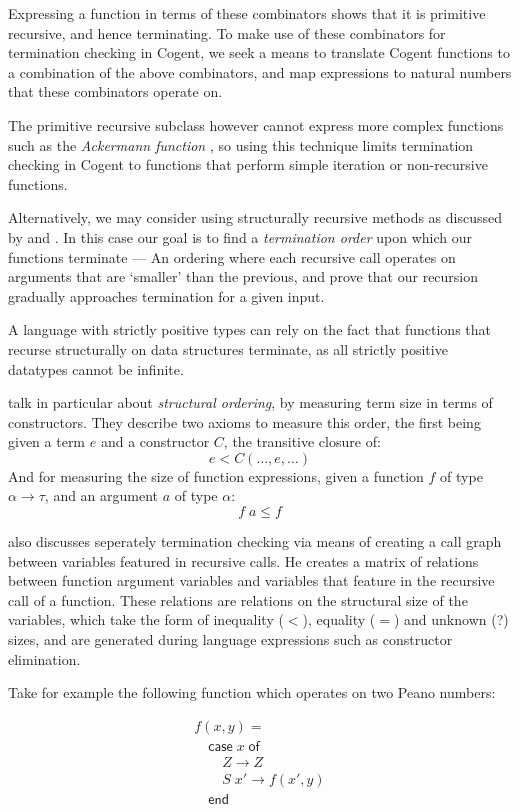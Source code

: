 Expressing a function in terms of these combinators shows that it is primitive recursive,
and hence terminating. To make use of these combinators for termination checking 
in Cogent, we seek a means to translate Cogent functions to a combination of the above
combinators, and map expressions to natural numbers that these combinators operate on.

The primitive recursive subclass however cannot express more complex functions such
as the \textit{Ackermann function} \citep{Ackermann}, so using this technique limits
termination checking in Cogent to functions that perform simple iteration or
non-recursive functions.

Alternatively, we may consider using
structurally recursive methods as discussed by \citet{StrucrecStructures} and
\citet{PredicateStructrec}. In this case our goal is to find a
\textit{termination order} upon which our functions terminate --- An ordering
where each recursive call operates on arguments that are `smaller' than the
previous, and prove that our recursion gradually 
approaches termination for a given input. 

A language with strictly positive types can rely on the fact that functions that
recurse structurally on data structures terminate, as all strictly positive datatypes
cannot be infinite.

\citet{PredicateStructrec} talk in particular about \textit{structural ordering}, 
by measuring term size in terms of constructors. They describe two axioms to measure
this order, the first being given a term $e$ and a constructor $C$, the transitive closure of:
$$
    e < C (\dots, e, \dots)
$$
And for measuring the size of function expressions, given a function $f$ of 
type $\alpha \longrightarrow \tau$, and an argument $a$ of type $\alpha$:
$$
    f\; a \leq f
$$

\citet{Foetus} also discusses seperately termination checking via means of
creating a call graph between variables featured in recursive calls. He creates
a matrix of relations between function argument variables and variables that
feature in the recursive call of a function. These relations are relations
on the structural size of the variables, which take the form of inequality ($<$),
equality ($=$) and unknown (\textsf{?}) sizes, and are generated during
language expressions such as constructor elimination. 

Take for example the following function which operates on two Peano numbers:

\[
    \begin{array}{l}
    f(x,y) = \\
    \hspace{1em} \textsf{case}\; x\; \textsf{of} \\
    \hspace{2em}    Z    \rightarrow Z \\
    \hspace{2em}    S\; x' \rightarrow f(x',y) \\
    \hspace{1em} \textsf{end}
    \end{array}
\]


